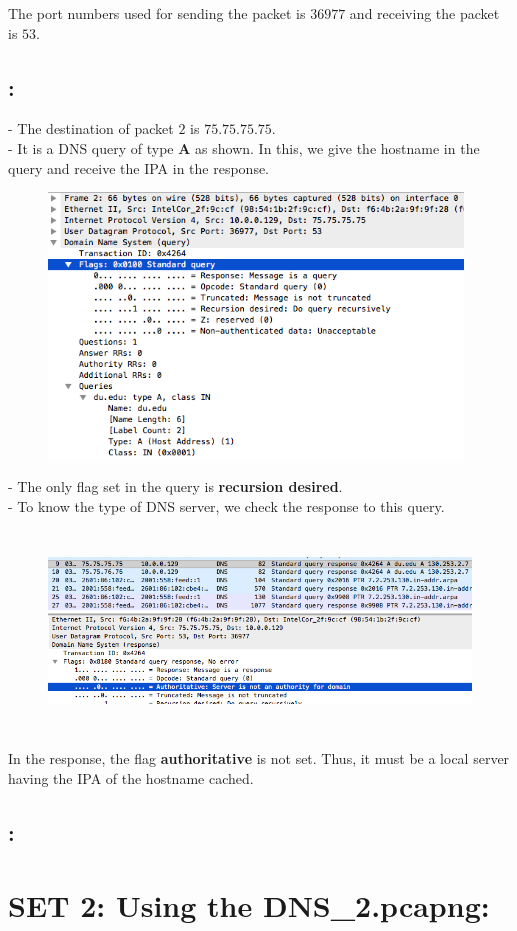 \documentclass[]{report}
\begin{document}
The port numbers used for sending the packet is $36977$ and receiving the packet is $53$. 

\subsection{:}
- The destination of packet $2$ is $75.75.75.75$. \\
- It is a DNS query of type \textbf{A} as shown. In this, we give the hostname in the query and receive the IPA in the response. 
\\
\begin{figure}[H]
	\vspace{0pt}
	\includegraphics[height = 200pt, keepaspectratio]{Snapshots/1_3_1.png}
\end{figure}
- The only flag set in the query is \textbf{recursion desired}.
\\
- To know the type of DNS server, we check the response to this query. 
\begin{figure}[H]
	\vspace{0pt}
	\includegraphics[height = 150pt, keepaspectratio]{Snapshots/1_3_2.png}
\end{figure}
In the response, the flag \textbf{authoritative} is not set. Thus, it must be a local server having the IPA of the hostname cached. 

\subsection{:}



\section{SET 2: Using the DNS\_2.pcapng:}

\end{document}
